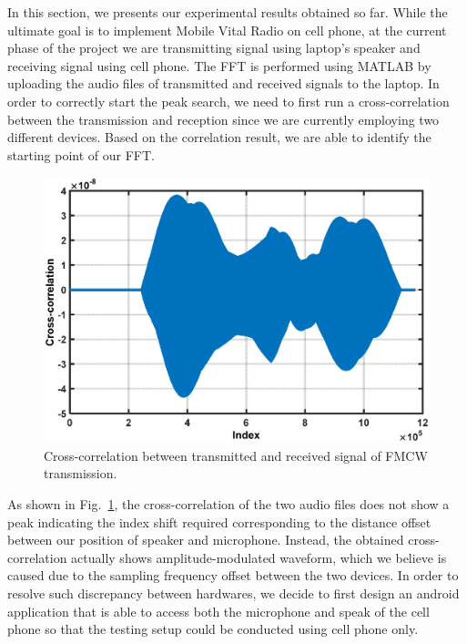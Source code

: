 %
%

In this section, we presents our experimental results obtained so far. While the ultimate goal is to implement Mobile Vital Radio on cell phone, at the current phase of the project we are transmitting signal using laptop's speaker and receiving signal using cell phone. The FFT is performed using MATLAB by uploading the audio files of transmitted and received signals to the laptop. In order to correctly start the peak search, we need to first run a cross-correlation between the transmission and reception since we are currently employing two different devices. Based on the correlation result, we are able to identify the starting point of our FFT.

%
\begin{figure}[!htbp]
	\centering
	\includegraphics[width=0.9\columnwidth]{Fig02_corr}
	\captionsetup{justification=raggedright, singlelinecheck=false}
	\caption{Cross-correlation between transmitted and received signal of FMCW transmission.}
	\label{fig:corr}
\end{figure}
%

As shown in Fig.~\ref{fig:corr}, the cross-correlation of the two audio files does not show a peak indicating the index shift required corresponding to the distance offset between our position of speaker and microphone. Instead, the obtained cross-correlation actually shows amplitude-modulated waveform, which we believe is caused due to the sampling frequency offset between the two devices. In order to resolve such discrepancy between hardwares, we decide to first design an android application that is able to access both the microphone and speak of the cell phone so that the testing setup could be conducted using cell phone only. 

